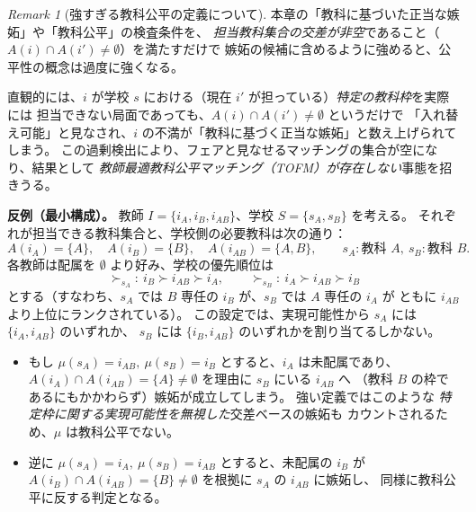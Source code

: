 \documentclass[12pt, a4paper]{article}
\theoremstyle{definition}
\theoremstyle{remark}
\newtheorem{remark}{Remark}
\theoremstyle{plain}
\begin{document}
\bigbreak


\begin{remark}[強すぎる教科公平の定義について]
本章の「教科に基づいた正当な嫉妬」や「教科公平」の検査条件を、
\emph{担当教科集合の交差が非空}であること（$A(i)\cap A(i')\neq\emptyset$）を満たすだけで
嫉妬の候補に含めるように強めると、公平性の概念は過度に強くなる。

直観的には、$i$ が学校 $s$ における（現在 $i'$ が担っている）\emph{特定の教科枠}を実際には
担当できない局面であっても、$A(i)\cap A(i')\neq\emptyset$ というだけで
「入れ替え可能」と見なされ、$i$ の不満が「教科に基づく正当な嫉妬」と数え上げられてしまう。
この過剰検出により、フェアと見なせるマッチングの集合が空になり、結果として
\emph{教師最適教科公平マッチング（TOFM）が存在しない}事態を招きうる。

\medskip
\noindent\textbf{反例（最小構成）。}
教師 $I=\{i_A,i_B,i_{AB}\}$、学校 $S=\{s_A,s_B\}$ を考える。
それぞれが担当できる教科集合と、学校側の必要教科は次の通り：
\[
A(i_A)=\{A\},\quad A(i_B)=\{B\},\quad A(i_{AB})=\{A,B\},\qquad
s_A:\text{教科 }A,\ s_B:\text{教科 }B.
\]
各教師は配属を $\emptyset$ より好み、学校の優先順位は
\[
\succ_{s_A}:\ i_B \succ i_{AB} \succ i_A,\qquad
\succ_{s_B}:\ i_A \succ i_{AB} \succ i_B
\]
とする（すなわち、$s_A$ では $B$ 専任の $i_B$ が、$s_B$ では $A$ 専任の $i_A$ が
ともに $i_{AB}$ より上位にランクされている）。
この設定では、実現可能性から $s_A$ には $\{i_A,i_{AB}\}$ のいずれか、
$s_B$ には $\{i_B,i_{AB}\}$ のいずれかを割り当てるしかない。

\begin{itemize}
\item もし $\mu(s_A)=i_{AB},\ \mu(s_B)=i_B$ とすると、$i_A$ は未配属であり、
$A(i_A)\cap A(i_{AB})=\{A\}\neq\emptyset$ を理由に $s_B$ にいる $i_{AB}$ へ
（教科 $B$ の枠であるにもかかわらず）嫉妬が成立してしまう。
強い定義ではこのような \emph{特定枠に関する実現可能性を無視した}交差ベースの嫉妬も
カウントされるため、$\mu$ は教科公平でない。

\item 逆に $\mu(s_A)=i_A,\ \mu(s_B)=i_{AB}$ とすると、未配属の $i_B$ が
$A(i_B)\cap A(i_{AB})=\{B\}\neq\emptyset$ を根拠に $s_A$ の $i_{AB}$ に嫉妬し、
同様に教科公平に反する判定となる。
\end{itemize}


\end{remark}
\end{document}

